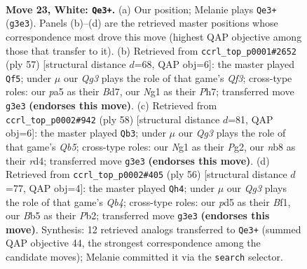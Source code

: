 \documentclass[11pt]{article}
\begin{document}
\clearpage

\begin{figure}[p]\centering
\begin{subfigure}{0.46\textwidth}\centering
\resizebox{\linewidth}{!}{%
\newchessgame
\chessboard[
  setfen={rn5r/8/5p1k/pB1p3p/3q4/6Q1/PP3KP1/1R4N1 w - - 0 23},
  showmover=false,
  pgfstyle=straightmove, color=movearrow, markmove={g3-e3}
]}
\caption{}
\end{subfigure}\hfill
\begin{subfigure}{0.46\textwidth}\centering
\resizebox{\linewidth}{!}{%
\newchessgame
\chessboard[
  setfen={8/3b1pkp/B1nP1q2/3Q4/p7/2r5/3N1PP1/4R1K1 b - - 4 29},
  showmover=false,
  pgfstyle=straightmove, color=movearrow, markmove={f6-f5}
]}
\caption{}
\end{subfigure}
\\[4pt]
\begin{subfigure}{0.46\textwidth}\centering
\resizebox{\linewidth}{!}{%
\newchessgame
\chessboard[
  setfen={8/6kp/4p1p1/1Q2n3/3rq3/8/1R2BPPP/6K1 w - - 3 30},
  showmover=false,
  pgfstyle=straightmove, color=movearrow, markmove={b5-b3}
]}
\caption{}
\end{subfigure}\hfill
\begin{subfigure}{0.46\textwidth}\centering
\resizebox{\linewidth}{!}{%
\newchessgame
\chessboard[
  setfen={3r2k1/pp3pp1/3n4/3P4/1Q6/2R3P1/qP3P2/5BK1 w - - 5 29},
  showmover=false,
  pgfstyle=straightmove, color=movearrow, markmove={b4-h4}
]}
\caption{}
\end{subfigure}
\caption{\textbf{Move 23, White: \texttt{Qe3+}.} (a) Our position; Melanie plays \texttt{Qe3+} (\texttt{g3e3}). Panels (b)--(d) are the retrieved master positions whose correspondence most drove this move (highest QAP objective among those that transfer to it). (b) Retrieved from \texttt{ccrl\_top\_p0001\#2652} (ply 57) [structural distance $d$=68, QAP obj=6]: the master played \texttt{Qf5}; under $\mu$ our \emph{Qg3} plays the role of that game's \emph{Qf3}; cross-type roles: our \emph{p}a5 as their \emph{B}d7, our \emph{N}g1 as their \emph{P}h7; transferred move \texttt{g3e3} \textbf{(endorses this move)}. (c) Retrieved from \texttt{ccrl\_top\_p0002\#942} (ply 58) [structural distance $d$=81, QAP obj=6]: the master played \texttt{Qb3}; under $\mu$ our \emph{Qg3} plays the role of that game's \emph{Qb5}; cross-type roles: our \emph{N}g1 as their \emph{P}g2, our \emph{n}b8 as their \emph{r}d4; transferred move \texttt{g3e3} \textbf{(endorses this move)}. (d) Retrieved from \texttt{ccrl\_top\_p0002\#405} (ply 56) [structural distance $d$=77, QAP obj=4]: the master played \texttt{Qh4}; under $\mu$ our \emph{Qg3} plays the role of that game's \emph{Qb4}; cross-type roles: our \emph{p}d5 as their \emph{B}f1, our \emph{B}b5 as their \emph{P}b2; transferred move \texttt{g3e3} \textbf{(endorses this move)}. Synthesis: 12 retrieved analogs transferred to \texttt{Qe3+} (summed QAP objective 44, the strongest correspondence among the candidate moves); Melanie committed it via the \texttt{search} selector.}
\label{fig:thought-m44}
\end{figure}
\end{document}
